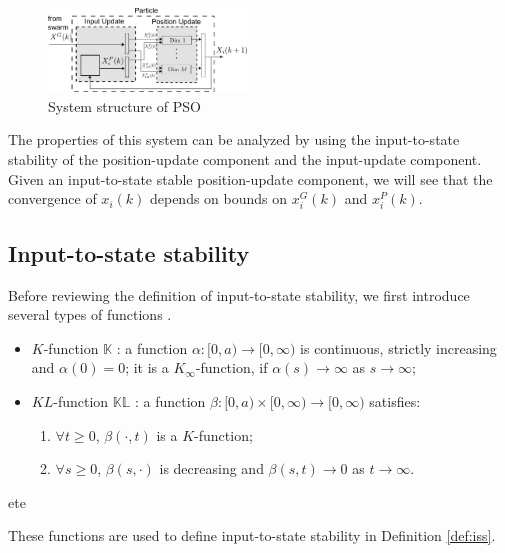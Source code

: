 \documentclass{sig-alternate}
\begin{document}
\begin{figure}
	\centering
	\includegraphics[width=0.47\textwidth]{particle_sys_flow.pdf}
	\caption{System structure of PSO}
	\label{fig:sys_flow}
\end{figure}

The properties of this system can be analyzed by using the input-to-state stability of the position-update component and the input-update component. 
Given an input-to-state stable position-update component, we will see that the convergence of $ x_{i}(k) $ depends on bounds on $ x^{G}_{i}(k) $ and $ x^{P}_{i}(k) $.

\subsection{Input-to-state stability}
\label{sec:def_iss}

Before reviewing the definition of input-to-state stability, we first introduce several types of functions \cite{Jiang2001857}.
\begin{itemize}
	\item $ K $-function $ \mathbb{K} $ : a function $ \alpha  : [ 0, a ) \rightarrow [ 0, \infty ) $ is continuous, strictly increasing and $ \alpha (0) = 0 $; it is a $ K_{\infty} $-function, if $ \alpha (s) \rightarrow \infty $ as $ s \rightarrow \infty $;
	\item $ KL $-function $ \mathbb{KL} $ : a function $ \beta : [ 0, a ) \times [ 0 , \infty ) \rightarrow [ 0, \infty ) $ satisfies:
	\begin{enumerate}
		\item $ \forall t \geq 0 $, $ \beta (\cdot , t ) $ is a $ K $-function;
		\item $ \forall s \geq 0 $, $ \beta (s, \cdot) $ is decreasing and $ \beta(s,t) \rightarrow 0 $ as $ t \rightarrow \infty $.
	\end{enumerate}
\end{itemize}ete

These functions are used to define input-to-state stability in Definition \ref{def:iss}.
\end{document}

